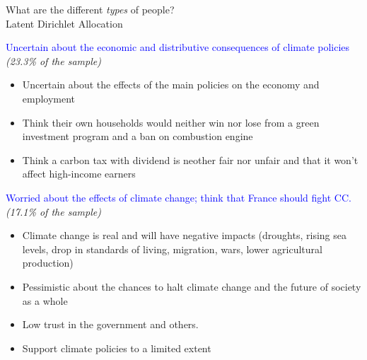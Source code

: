 \begin{framefont}{\small}

\begin{frame}{What are the different \textit{types} of people? \\ Latent Dirichlet Allocation}
\begin{itemize}
\ip \textcolor{blue}{Uncertain about the economic and distributive consequences of climate policies} \textit{(23.3\% of the sample)}
	\begin{itemize}
		\item Uncertain about the effects of the main policies on the economy and employment
		\item Think their own households would neither win nor lose from a green investment program and a ban on combustion engine
		\item Think a carbon tax with dividend is neother fair nor unfair and that it won't affect high-income earners
	\end{itemize}

\ip \textcolor{blue}{Worried about the effects of climate change; think that France should fight CC.} \textit{(17.1\% of the sample)}
	\begin{itemize}
		\item Climate change is real and will have negative impacts (droughts, rising sea levels, drop in standards of living, migration, wars, lower agricultural production)
		\item Pessimistic about the chances to halt climate change and the future of society as a whole
		\item Low trust in the government and others.
		\item Support climate policies to a limited extent
	\end{itemize}
\end{itemize}
\end{frame}


\end{framefont}
